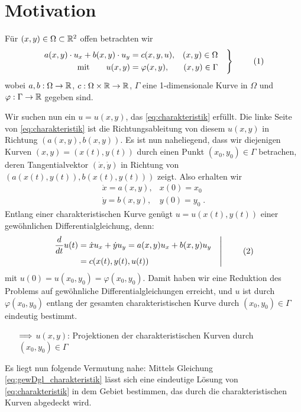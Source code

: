 

\section{Motivation}

Für $(x,y)\in\Omega\subset\mathbb{R}^2$ offen betrachten wir
\[
  \left.
  \begin{aligned}
      a(x,y)\cdot u_x+b(x,y)\cdot u_y & = c(x,y,u), &(x,y)\in\Omega \\
    \text{mit}\qquad  u(x,y) &= \varphi(x,y), &(x,y)\in\Gamma
  \end{aligned}
  \quad
  \right\}
  \eq{eq:charakteristik}
\]
wobei $a,b:\Omega\rightarrow\mathbb{R}$, $c:\Omega\times\mathbb{R}\rightarrow\mathbb{R}$, $\Gamma$ eine 1-dimensionale Kurve in $\Omega$ und $\varphi:\Gamma\rightarrow\mathbb{R}$ gegeben sind. 

Wir suchen nun ein $u=u(x,y)$, das \eqref{eq:charakteristik} erfüllt.
Die linke Seite von \eqref{eq:charakteristik} ist die Richtungsableitung von diesem $u(x,y)$ in Richtung $(a(x,y),b(x,y))$. Es ist nun naheliegend, dass wir diejenigen Kurven $(x,y)=(x(t),y(t))$ durch einen Punkt $(x_0,y_0)\in\Gamma$ betrachen, deren Tangentialvektor $(\dot x,\dot y)$ in Richtung von $\left(a(x(t),y(t)), b(x(t),y(t))\right)$ zeigt. Also erhalten wir
\begin{eqnarray*}
  \dot x = a(x,y), & x(0)=x_0 \\
  \dot y = b(x,y), & y(0)=y_0\;.
\end{eqnarray*}
Entlang einer charakteristischen Kurve genügt $u=u(x(t),y(t))$ einer gewöhn\-lichen Differentialgleichung, denn:
\[
\left.
  \begin{aligned}
    \diff t u(t) &= \dot x u_x+\dot y u_y=a(x,y)u_x+b(x,y)u_y \\
    &= c(x(t),y(t),u(t))
  \end{aligned}
  \quad
\right\vert
\eq{eq:gewDgl_charakteristik}
\]
mit $u(0)=u(x_0,y_0)=\varphi (x_0,y_0)$. Damit haben wir eine Reduktion des Problems auf gewöhnliche Differentialgleichungen erreicht, und $u$ ist durch $\varphi(x_0,y_0)$ entlang der gesamten charakteristischen Kurve durch $(x_0,y_0)\in\Gamma$ eindeutig bestimmt.
\begin{itemize}
\item[$\Longrightarrow$] $u(x,y)$: Projektionen der charakteristischen Kurven durch $(x_0,y_0)\in\Gamma$
\end{itemize}

Es liegt nun folgende Vermutung nahe: Mittels Gleichung \eqref{eq:gewDgl_charakteristik} lässt sich eine eindeutige Lösung von \eqref{eq:charakteristik} in dem Gebiet bestimmen, das durch die charakteristischen Kurven abgedeckt wird.

